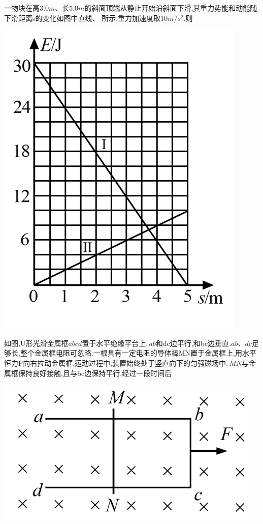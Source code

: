 \question[6]一物块在高$3.0m、$长$5.0m$的斜面顶端从静止开始沿斜面下滑,其重力势能和动能随下滑距离s的变化如图中直线\uppercase\expandafter{}、\uppercase\expandafter{ }所示,重力加速度取$10m/s^2.$则
\begin{center}
\includegraphics[]{img/image8.png}
\end{center}

\begin{solution}{4cm}

\end{solution}



\question[6]如图,U形光滑金属框$abcd$置于水平绝缘平台上$,ab$和dc边平行,和bc边垂直$.ab$、$dc$足够长,整个金属框电阻可忽略.一根具有一定电阻的导体棒MN置于金属框上,用水平恒力F向右拉动金属框,运动过程中,装置始终处于竖直向下的匀强磁场中$,MN$与金属框保持良好接触,且与bc边保持平行.经过一段时间后
\begin{center}
\includegraphics[]{img/image9.png}
\end{center}

\begin{solution}{4cm}

\end{solution}
\newpage


